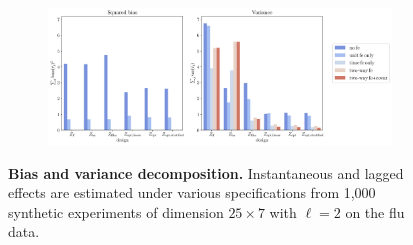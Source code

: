 \begin{figure}[H]
	\centering
	\begin{subfigure}{.9\textwidth}
		\centering
		\includegraphics[width=1\linewidth]{plots/empirical/flu/nonadaptive/flu_N_25_T_7_bias-variance.pdf}
	\end{subfigure}
	\caption{\textbf{Bias and variance decomposition.} Instantaneous and lagged effects are estimated under various specifications from 1,000 synthetic experiments of dimension $25\times 7$ with $\ell = 2$ on the flu data. }
	\label{fig:bias-variance}
\end{figure}


